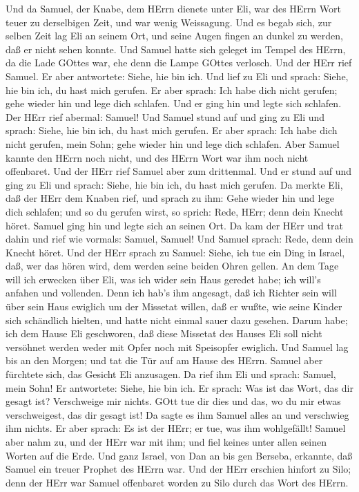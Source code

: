  Und da Samuel, der Knabe, dem HErrn dienete unter Eli, war
des HErrn Wort teuer zu derselbigen Zeit, und war wenig Weissagung.
 Und es begab sich, zur selben Zeit lag Eli an seinem Ort,
und seine Augen fingen an dunkel zu werden, daß er nicht sehen konnte.
 Und Samuel hatte sich geleget im Tempel des HErrn, da die
Lade GOttes war, ehe denn die Lampe GOttes verlosch.  Und
der HErr rief Samuel. Er aber antwortete: Siehe, hie bin ich.
 Und lief zu Eli und sprach: Siehe, hie bin ich, du hast
mich gerufen. Er aber sprach: Ich habe dich nicht gerufen; gehe wieder
hin und lege dich schlafen. Und er ging hin und legte sich schlafen.
 Der HErr rief abermal: Samuel! Und Samuel stund auf und
ging zu Eli und sprach: Siehe, hie bin ich, du hast mich gerufen. Er
aber sprach: Ich habe dich nicht gerufen, mein Sohn; gehe wieder hin und
lege dich schlafen.  Aber Samuel kannte den HErrn noch
nicht, und des HErrn Wort war ihm noch nicht offenbaret. 
Und der HErr rief Samuel aber zum drittenmal. Und er stund auf und ging
zu Eli und sprach: Siehe, hie bin ich, du hast mich gerufen. Da merkte
Eli, daß der HErr dem Knaben rief,  und sprach zu ihm: Gehe
wieder hin und lege dich schlafen; und so du gerufen wirst, so sprich:
Rede, HErr; denn dein Knecht höret. Samuel ging hin und legte sich an
seinen Ort.  Da kam der HErr und trat dahin und rief wie
vormals: Samuel, Samuel! Und Samuel sprach: Rede, denn dein Knecht
höret.  Und der HErr sprach zu Samuel: Siehe, ich tue ein
Ding in Israel, daß, wer das hören wird, dem werden seine beiden Ohren
gellen.  An dem Tage will ich erwecken über Eli, was ich
wider sein Haus geredet habe; ich will's anfahen und vollenden.
 Denn ich hab's ihm angesagt, daß ich Richter sein will
über sein Haus ewiglich um der Missetat willen, daß er wußte, wie seine
Kinder sich schändlich hielten, und hatte nicht einmal sauer dazu
gesehen.  Darum habe; ich dem Hause Eli geschworen, daß
diese Missetat des Hauses Eli soll nicht versöhnet werden weder mit
Opfer noch mit Speisopfer ewiglich.  Und Samuel lag bis an
den Morgen; und tat die Tür auf am Hause des HErrn. Samuel aber
fürchtete sich, das Gesicht Eli anzusagen.  Da rief ihm Eli
und sprach: Samuel, mein Sohn! Er antwortete: Siehe, hie bin ich.
 Er sprach: Was ist das Wort, das dir gesagt ist?
Verschweige mir nichts. GOtt tue dir dies und das, wo du mir etwas
verschweigest, das dir gesagt ist!  Da sagte es ihm Samuel
alles an und verschwieg ihm nichts. Er aber sprach: Es ist der HErr; er
tue, was ihm wohlgefällt!  Samuel aber nahm zu, und der
HErr war mit ihm; und fiel keines unter allen seinen Worten auf die
Erde.  Und ganz Israel, von Dan an bis gen Berseba,
erkannte, daß Samuel ein treuer Prophet des HErrn war.  Und
der HErr erschien hinfort zu Silo; denn der HErr war Samuel offenbaret
worden zu Silo durch das Wort des HErrn.

